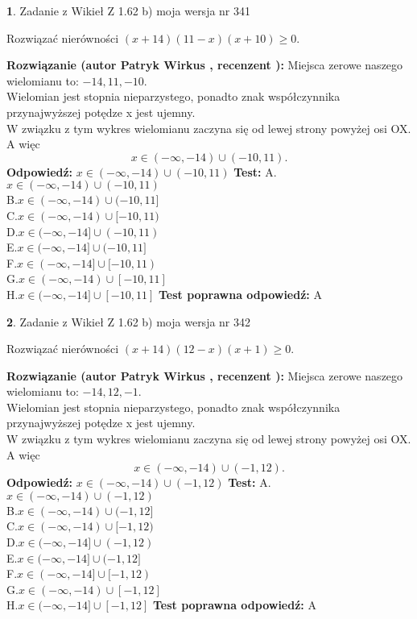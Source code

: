 \documentclass[12pt, a4paper]{article}
\theoremstyle{definition} %
\newtheorem{zad}{}
\newcommand{\zadStart}[1]{\begin{zad}#1\newline}
\newcommand{\zadStop}{\end{zad}}
\newcommand{\rozwStart}[2]{\noindent \textbf{Rozwiązanie (autor #1 , recenzent #2): }\newline}
\newcommand{\rozwStop}{\newline}
\newcommand{\odpStart}{\noindent \textbf{Odpowiedź:}\newline}
\newcommand{\odpStop}{\newline}
\newcommand{\testStart}{\noindent \textbf{Test:}\newline}
\newcommand{\testStop}{\newline}
\newcommand{\kluczStart}{\noindent \textbf{Test poprawna odpowiedź:}\newline}
\newcommand{\kluczStop}{\newline}
\begin{document}
\zadStart{Zadanie z Wikieł Z 1.62 b) moja wersja nr 341}

Rozwiązać nierówności $(x+14)(11-x)(x+10)\ge0$.
\zadStop
\rozwStart{Patryk Wirkus}{}
Miejsca zerowe naszego wielomianu to: $-14, 11, -10$.\\
Wielomian jest stopnia nieparzystego, ponadto znak współczynnika przy\linebreak najwyższej potędze x jest ujemny.\\ W związku z tym wykres wielomianu zaczyna się od lewej strony powyżej osi OX. A więc $$x \in (-\infty,-14) \cup (-10,11).$$
\rozwStop
\odpStart
$x \in (-\infty,-14) \cup (-10,11)$
\odpStop
\testStart
A.$x \in (-\infty,-14) \cup (-10,11)$\\
B.$x \in (-\infty,-14) \cup (-10,11]$\\
C.$x \in (-\infty,-14) \cup [-10,11)$\\
D.$x \in (-\infty,-14] \cup (-10,11)$\\
E.$x \in (-\infty,-14] \cup (-10,11]$\\
F.$x \in (-\infty,-14] \cup [-10,11)$\\
G.$x \in (-\infty,-14) \cup [-10,11]$\\
H.$x \in (-\infty,-14] \cup [-10,11]$
\testStop
\kluczStart
A
\kluczStop



\zadStart{Zadanie z Wikieł Z 1.62 b) moja wersja nr 342}

Rozwiązać nierówności $(x+14)(12-x)(x+1)\ge0$.
\zadStop
\rozwStart{Patryk Wirkus}{}
Miejsca zerowe naszego wielomianu to: $-14, 12, -1$.\\
Wielomian jest stopnia nieparzystego, ponadto znak współczynnika przy\linebreak najwyższej potędze x jest ujemny.\\ W związku z tym wykres wielomianu zaczyna się od lewej strony powyżej osi OX. A więc $$x \in (-\infty,-14) \cup (-1,12).$$
\rozwStop
\odpStart
$x \in (-\infty,-14) \cup (-1,12)$
\odpStop
\testStart
A.$x \in (-\infty,-14) \cup (-1,12)$\\
B.$x \in (-\infty,-14) \cup (-1,12]$\\
C.$x \in (-\infty,-14) \cup [-1,12)$\\
D.$x \in (-\infty,-14] \cup (-1,12)$\\
E.$x \in (-\infty,-14] \cup (-1,12]$\\
F.$x \in (-\infty,-14] \cup [-1,12)$\\
G.$x \in (-\infty,-14) \cup [-1,12]$\\
H.$x \in (-\infty,-14] \cup [-1,12]$
\testStop
\kluczStart
A
\kluczStop
\end{document}
